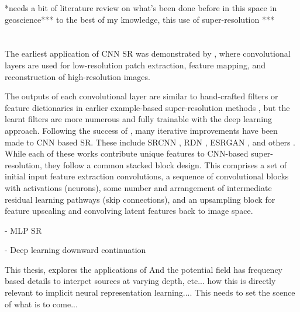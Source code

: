 \documentclass[manuscript.tex]{subfiles}
\begin{document}



*needs a bit of literature review on what's been done before in this space in geoscience***
to the best of my knowledge, this use of super-resolution ***

\section{}
\label{sec:introgeoml}


The earliest application of CNN SR was demonstrated by \parencite{dongLearningDeepConvolutional2014}, where convolutional layers are used for low-resolution patch extraction, feature mapping, and reconstruction of high-resolution images.

The outputs of each convolutional layer are similar to hand-crafted filters or feature dictionaries in earlier example-based super-resolution methods \parencite{freemanExamplebasedSuperresolution2002}, but the learnt filters are more numerous and fully trainable with the deep learning approach.
Following the success of \parencite{dongLearningDeepConvolutional2014}, many iterative improvements have been made to CNN based SR\@.
These include SRCNN \parencite{dongImageSuperresolutionUsing2016}, RDN \parencite{zhangResidualDenseNetwork2018}, ESRGAN \parencite{wangESRGANEnhancedSuperresolution2018}, and others \parencite{ledigPhotorealisticSingleImage2017,limEnhancedDeepResidual2017}.
While each of these works contribute unique features to CNN-based super-resolution, they follow a common stacked block design.
This comprises a set of initial input feature extraction convolutions, a sequence of convolutional blocks with activations (neurons), some number and arrangement of intermediate residual learning pathways (skip connections), and an upsampling block for feature upscaling and convolving latent features back to image space.


- MLP SR

- Deep learning downward continuation


This thesis, explores the applications of
And the potential field has frequency based details to interpet sources at varying depth, etc...
how this is directly relevant to implicit neural representation learning....
This needs to set the scence of what is to come...
\end{document}
